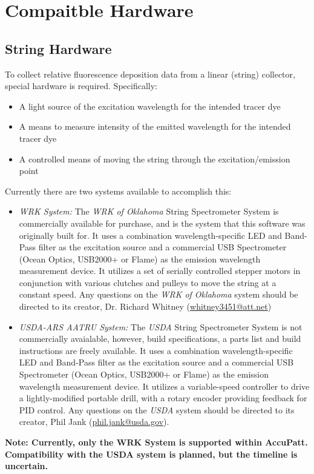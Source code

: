 \documentclass[10pt,letterpaper,titlepage]{article}
\begin{document}
    \newpage

    \section{Compaitble Hardware}

    \subsection{String Hardware}
    To collect relative fluorescence deposition data from a linear (string) collector, special hardware is required. Specifically: 
    \begin{itemize}
        \item A light source of the excitation wavelength for the intended tracer dye
        \item A means to measure intensity of the emitted wavelength for the intended tracer dye
        \item A controlled means of moving the string through the excitation/emission point
    \end{itemize}
    Currently there are two systems available to accomplish this:
    \begin{itemize}
        \item{\textit{WRK System:}} The \textit{WRK of Oklahoma} String Spectrometer System is commercially available for purchase, and is the system that this software was originally built for. It uses a combination wavelength-specific LED and Band-Pass filter as the excitation source and a commercial USB Spectrometer (Ocean Optics, USB2000+ or Flame) as the emission wavelength measurement device. It utilizes a set of serially controlled stepper motors in conjunction with various clutches and pulleys to move the string at a constant speed. Any questions on the \textit{WRK of Oklahoma} system should be directed to its creator, Dr. Richard Whitney (\href{mailto:whitney3451@att.net}{whitney3451@att.net})
        \item{\textit{USDA-ARS AATRU System:}} The \textit{USDA} String Spectrometer System is not commercially avaialable, however, build specifications, a parts list and build instructions are freely available. It uses a combination wavelength-specific LED and Band-Pass filter as the excitation source and a commercial USB Spectrometer (Ocean Optics, USB2000+ or Flame) as the emission wavelength measurement device. It utilizes a variable-speed controller to drive a lightly-modified portable drill, with a rotary encoder providing feedback for PID control. Any questions on the \textit{USDA} system should be directed to its creator, Phil Jank (\href{mailto:phil.jank@usda.gov}{phil.jank@usda.gov}).
    \end{itemize}
    \textbf{\color{red}Note: Currently, only the WRK System is supported within AccuPatt. Compatibility with the USDA system is planned, but the timeline is uncertain.\color{black}}
\end{document}
